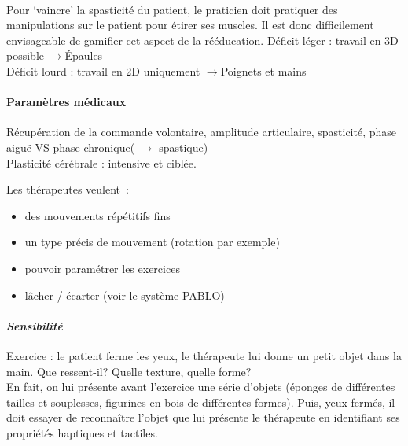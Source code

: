 \paragraph{}
Pour ‘vaincre’ la spasticité du patient, le praticien doit pratiquer des manipulations sur le patient pour étirer ses muscles. Il est donc difficilement envisageable de gamifier cet aspect de la rééducation.\newline
Déficit léger : travail en 3D possible     \quad$ \rightarrow $\quad       Épaules\\
Déficit lourd : travail en 2D uniquement  \quad $\rightarrow $\quad      Poignets et mains

	\paragraph{Paramètres médicaux\\}
Récupération de la commande volontaire, amplitude articulaire, spasticité, phase aiguë VS phase chronique( $ \rightarrow $ spastique)\\
Plasticité cérébrale : intensive et ciblée. \newline

Les thérapeutes veulent~: 
\begin{itemize}
	\item des mouvements répétitifs fins
	\item un type précis de mouvement (rotation par exemple)
	\item pouvoir paramétrer les exercices
	\item lâcher / écarter (voir le système PABLO)
\end{itemize}

	\paragraph{\emph{Sensibilité} \\ \quad}
Exercice : le patient ferme les yeux, le thérapeute lui donne un petit objet dans la main. Que ressent-il? Quelle texture, quelle forme? \\
En fait, on lui présente avant l’exercice une série d’objets (éponges de différentes tailles et souplesses, figurines en bois de différentes formes). Puis, yeux fermés, il doit essayer de reconnaître l’objet que lui présente le thérapeute en identifiant ses propriétés haptiques et tactiles.
